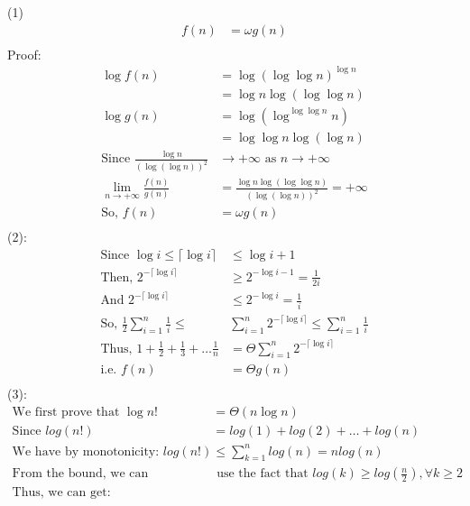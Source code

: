 \documentclass[letterpaper, 11pt]{article}
\newcommand{\1}{\mathds{1}}	%
\theoremstyle{definition}
\newenvironment{solution}{{\par\noindent\it Solution.}}{}
\begin{document}
    \begin{solution}
        (1)
    \begin{align*}
        f(n) &= \omega  g(n) \\
    \end{align*}
    Proof:
        \begin{align*}
        \log{f(n)} &= \log{(\log\log n)^{\log n}} \\
        &= \log n{\log (\log\log n)} \\
        \log{g(n)} &= \log{(\log^{\log\log n}n)} \\
        &= \log \log n\log ( \log n) \\
        \text{Since }\frac{\log n}{(\log ( \log n))^2} &\rightarrow +\infty \text{ as } n\rightarrow +\infty \\
        \lim_{n\rightarrow +\infty}\frac{f(n)}{g(n)}&= \frac{\log n{\log (\log\log n)}}{(\log ( \log n))^2}=+\infty  \\
        \text{So, }f(n) &= \omega  g(n) \\
    \end{align*}
    (2): \begin{align*}{}{}
    \text{Since }\log i \leq \lceil\log i \rceil &\leq \log i + 1 \\
    \text{Then, } 2^{-\lceil\log i \rceil}&\geq 2^{-\log i - 1}=\frac{1}{2i}\\
    \text{And }2^{-\lceil\log i \rceil}&\leq 2^{-\log i}=\frac{1}{i}\\
    \text{So, } \frac{1}{2}\sum_{i=1}^{n} \frac{1}{i}\leq&\sum_{i=1}^{n} 2^{-\lceil\log i \rceil}\leq\sum_{i=1}^{n} \frac{1}{i} \\
    \text{Thus, } 1 + \frac{1}{2} + \frac{1}{3} + \ldots \frac{1}{n}&=\Theta \sum_{i=1}^{n} 2^{-\lceil\log i \rceil} \\
    \text{i.e. } f(n)&=\Theta g(n) \\
   \end{align*} 
   (3):\begin{align*}
    \text{We first prove that } \log n! &= \Theta(n\log n)\\
    \text{Since } log(n!)&=log(1)+log(2)+\ldots+log(n)\\
    \text{We have by monotonicity: }log(n!)&\leq \sum_{k=1}^{n}log(n)=nlog(n)\\
    \text{From the bound, we can}&\text{ use the fact that }log(k)\geq log(\frac{n}{2}), \forall k\geq2\\
    \text{Thus, we can }\text{get:}&\\

\end{align*}
\end{solution}
\end{document}
